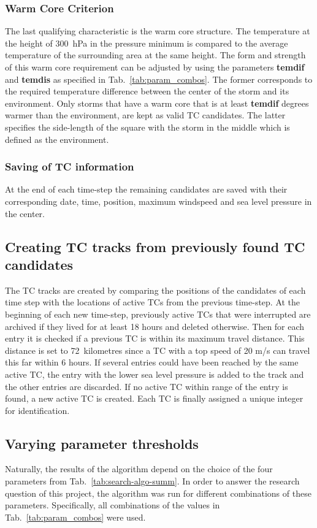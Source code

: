 \subsubsection*{Warm Core Criterion}
The last qualifying characteristic is the warm core structure. The temperature
at the height of 300~hPa in the pressure minimum is compared to the average
temperature of the surrounding area at the same height. The form and strength
of this warm core requirement can be adjusted by using the parameters
\textbf{temdif} and \textbf{temdis} as specified in Tab.~\ref{tab:param_combos}. The former corresponds to the required
temperature difference between the center of the storm and its environment.
Only storms that have a warm core that is at least \textbf{temdif} degrees
warmer than the environment, are kept as valid TC candidates. The latter
specifies the side-length of the square with the storm in the middle which is
defined as the environment.

\subsubsection*{Saving of TC information}
At the end of each time-step the remaining candidates are saved with their
corresponding date, time, position, maximum windspeed and sea level pressure in
the center.

\subsection{Creating TC tracks from previously found TC candidates}
The TC tracks are created by comparing the positions of the candidates of each time step with the locations of active TCs from the previous time-step. At the beginning of each new time-step, previously active TCs that were interrupted are archived if they lived for at
least 18 hours and deleted otherwise. Then for each entry it is checked if a
previous TC is within its maximum travel distance. This distance is set to
72~kilometres since a TC with a top speed of 20 m/s can travel this far within
6 hours. If several entries could have been reached by the same active TC, the
entry with the lower sea level pressure is added to the track and the other
entries are discarded. If no active TC within range of the entry is found, a new
active TC is created. Each TC is finally assigned a unique integer for
identification.

\subsection{Varying parameter thresholds}
Naturally, the results of the algorithm depend on the choice of the four
parameters from Tab.~\ref{tab:search-algo-summ}. In order to answer the
research question of this project, the algorithm was run for different
combinations of these parameters. Specifically, all combinations of the values
in Tab.~\ref{tab:param_combos} were used.


